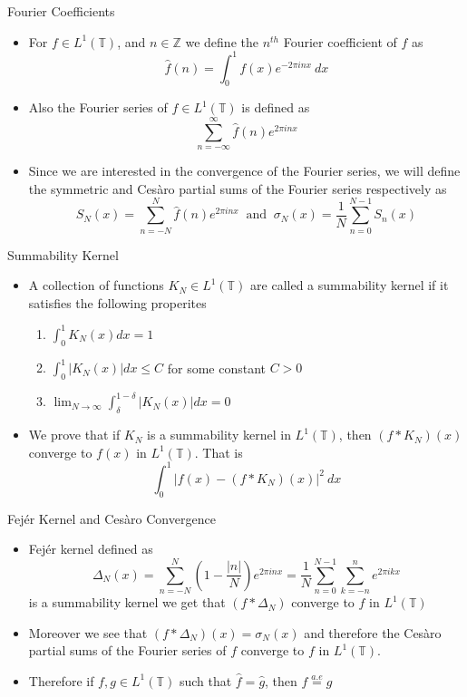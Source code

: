 \documentclass[compress]{beamer}
\newcommand{\Z}{\mathbb Z}
\newcommand{\T}{\mathbb T}
\begin{document}
\begin{frame}{Fourier Coefficients}
  \begin{itemize}
    \item For $f \in L^1(\T)$, and $n \in \Z$ we define the $n^{th}$ Fourier coefficient of $f$ as $$\hat{f}(n) = \int_0^1 f(x)e^{-2\pi i n x} \ dx $$
    \item Also the Fourier series of $f \in L^1(\T)$ is defined as $$\sum_{n=-\infty }^\infty \hat{f}(n) e^{2\pi in x} $$
    \item Since we are interested in the convergence of the Fourier series, we will define the symmetric and Ces\`aro partial sums of the Fourier series respectively as $$ S_N(x) = \sum_{n=-N}^N \hat{f}(n)e^{2\pi inx} \ \text{ and } \  \sigma_N(x) = \frac{1}{N}\sum_{n=0}^{N-1} S_n(x)$$
   \end{itemize}
\end{frame}

\begin{frame}{Summability Kernel}
  \begin{itemize}
    \item A collection of functions $K_N \in L^1(\T)$ are called a summability kernel if it satisfies the following properites
      \begin{enumerate}
        \item $\int_{0}^{1}K_N(x)dx = 1$
        \item $\int_{0}^{1}\lvert K_N(x)\rvert dx \le C$ for some constant $C>0$
        \item $\lim_{N\to\infty} \int_{\delta}^{1-\delta}\lvert K_N(x)\rvert dx= 0$
      \end{enumerate}
    \item We prove that if $K_N$ is a summability kernel in $L^1(\T)$, then $(f*K_N)(x)$ converge to $f(x)$ in $L^1(\T)$. That is $$\int_0^1 \lvert f(x) - (f*K_N)(x) \rvert^2 \ dx$$
  \end{itemize}
\end{frame}

\begin{frame}{Fej\'er Kernel and Ces\`aro Convergence}
  \begin{itemize}
    \item Fej\'er kernel defined as $$\Delta_N(x) = \sum_{n=-N}^N\left(1 - \frac{|n|}{N} \right)e^{2\pi inx} = \frac{1}{N}\sum_{n=0}^{N-1}\sum_{k=-n}^n e^{2\pi i k x}$$
      is a summability kernel we get that $(f*\Delta_N)$ converge to $f$ in $L^1(\T)$
    \item Moreover we see that $(f*\Delta_N)(x) = \sigma_N(x)$ and therefore the Ces\`aro partial sums of the Fourier series of $f$ converge to $f$ in $L^1(\T)$.
    \item Therefore if $f, g \in L^1(\T)$ such that $\hat{f} = \hat{g}$, then $f \stackrel{a.e}{=} g$
  \end{itemize}
\end{frame}
\end{document}
